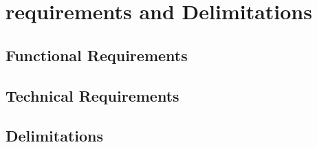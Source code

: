 \chapter{requirements and Delimitations}

\section{Functional Requirements}

\section{Technical Requirements}

\section{Delimitations}